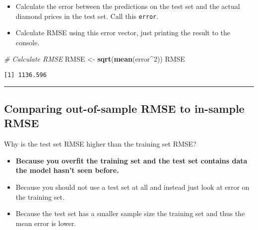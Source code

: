 \documentclass[]{book}
\newenvironment{Shaded}{\begin{snugshade}}{\end{snugshade}}
\newcommand{\KeywordTok}[1]{\textcolor[rgb]{0.13,0.29,0.53}{\textbf{#1}}}
\newcommand{\DecValTok}[1]{\textcolor[rgb]{0.00,0.00,0.81}{#1}}
\newcommand{\StringTok}[1]{\textcolor[rgb]{0.31,0.60,0.02}{#1}}
\newcommand{\CommentTok}[1]{\textcolor[rgb]{0.56,0.35,0.01}{\textit{#1}}}
\newcommand{\OperatorTok}[1]{\textcolor[rgb]{0.81,0.36,0.00}{\textbf{#1}}}
\newcommand{\NormalTok}[1]{#1}
\providecommand{\tightlist}{%
  \setlength{\itemsep}{0pt}\setlength{\parskip}{0pt}}
\begin{document}
\begin{itemize}
\tightlist
\item
  Calculate the error between the predictions on the test set and the
  actual diamond prices in the test set. Call this \texttt{error}.
\end{itemize}

\begin{Shaded}
\end{Shaded}

\begin{itemize}
\tightlist
\item
  Calculate RMSE using this error vector, just printing the result to
  the console.
\end{itemize}

\begin{Shaded}
\begin{Highlighting}[]
\CommentTok{# Calculate RMSE}
\NormalTok{RMSE <-}\StringTok{ }\KeywordTok{sqrt}\NormalTok{(}\KeywordTok{mean}\NormalTok{(error}\OperatorTok{^}\DecValTok{2}\NormalTok{))}
\NormalTok{RMSE}
\end{Highlighting}
\end{Shaded}

\begin{verbatim}
[1] 1136.596
\end{verbatim}

\begin{center}\rule{0.5\linewidth}{\linethickness}\end{center}

\subsection*{Comparing out-of-sample RMSE to in-sample
RMSE}\label{comparing-out-of-sample-rmse-to-in-sample-rmse}

Why is the test set RMSE higher than the training set RMSE?

\begin{itemize}
\item
  \textbf{Because you overfit the training set and the test set contains
  data the model hasn't seen before.}
\item
  Because you should not use a test set at all and instead just look at
  error on the training set.
\item
  Because the test set has a smaller sample size the training set and
  thus the mean error is lower.
\end{itemize}
\end{document}
